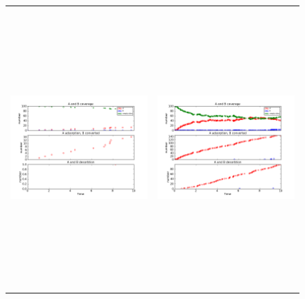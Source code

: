 \documentclass[11pt]{article}
\begin{document}
\setlength{\unitlength}{1in}
\begin{figure}[h!]
\begin{tabular}{cc}
\includegraphics[width=3.5in, height=4.2in]{./coadsorb_irreversible/AtoBirreversible10x10_101_AtoB2x_Ea5E3_Eirr10E3_3.png} &
\includegraphics[width=3.5in, height=4.2in]{./coadsorb_irreversible/AtoBirreversible10x10_201_AtoB2x_Ea5E3_Eirr10E3_3.png} \\

\end{tabular}
\end{figure}
\end{document}

